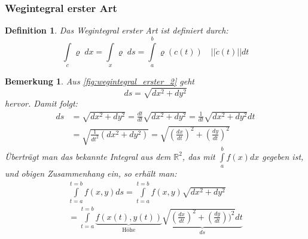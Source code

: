 \documentclass[12pt,a4paper]{article}%
\newtheorem{definition}[satz]{Definition}
\newtheorem{bem}{Bemerkung}[section]
\numberwithin{equation}{section}
\newcommand{\R}{\mathbb{R}} %
\numberwithin{equation}{subsection}
\begin{document}
	  \subsubsection{Wegintegral erster Art}
	  \begin{definition}
	    Das Wegintegral erster Art ist definiert durch:
	    \begin{equation}
	      \int\limits_c \varrho \; dx = \int\limits_x \varrho \; ds = \int\limits_a^b \varrho(c(t)) \quad || \dot{c}(t)|| dt \label{eq:wegintegral_1}
	    \end{equation}
	  \end{definition}
	  \begin{bem}
	    Aus \eqref{fig:wegintegral_erster_2} geht
	    \begin{equation*}
	      ds = \sqrt{dx^2 + dy^2}
	    \end{equation*}
	    hervor. Damit folgt:
	    \begin{align*}
	      ds &= \sqrt{dx^2 + dy^2} = \frac{dt}{dt}  \sqrt{dx^2 + dy^2} = \frac{1}{dt} \sqrt{dx^2 + dy^2}dt \\
	      &=  \sqrt{\frac{1}{dt^2}(dx^2 + dy^2)} =  \sqrt{\left(\frac{dx}{dt}\right)^2 + \left(\frac{dy}{dt}\right)^2}
	    \end{align*}
	    Überträgt man das bekannte Integral aus dem $\R^2$, das mit $\int\limits_a^b f(x) dx$ gegeben ist, und  obigen Zusammenhang ein, so erhält man:
	    \begin{align*}
	      \int\limits_{t=a}^{t=b} f(x,y) ds = \int\limits_{t=a}^{t=b} f(x,y) \sqrt{dx^2 + dy^2}\\
	      = \int\limits_{t=a}^{t=b} \underbrace{f(x(t),y(t))}_{\text{Höhe}} \underbrace{\sqrt{\left(\frac{dx}{dt}\right)^2 + \left(\frac{dy}{dt}\right))^2} dt}_{ds}
	    \end{align*}
	  \end{bem}
\end{document}

